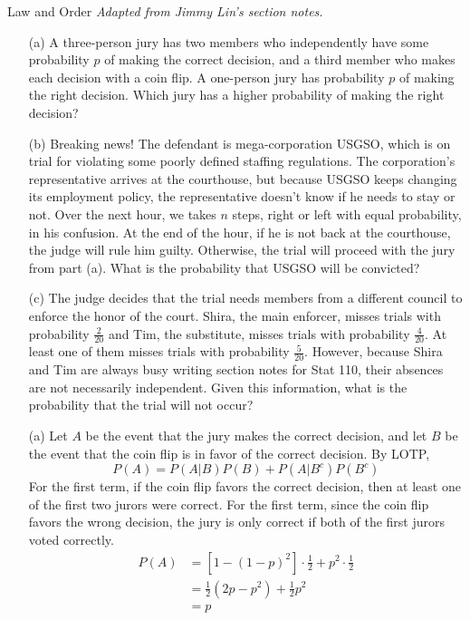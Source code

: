 \documentclass[11pt]{article}
\begin{document}
\begin{exercise}{Law and Order}
\textit{Adapted from Jimmy Lin's section notes.}
\begin{enumerate}
    \item [(a)] A three-person jury has two members who independently have some probability $p$ of making
    the correct decision, and a third member who makes each decision with a coin flip. A one-person
    jury has probability $p$ of making the right decision. Which jury has a higher probability
    of making the right decision?
    
    \item[(b)] Breaking news! The defendant is mega-corporation USGSO, which is on trial for violating some poorly defined staffing regulations. The corporation's representative arrives at the courthouse, but because USGSO keeps changing its employment policy, the representative doesn't know if he needs to stay or not. Over the next hour, we takes $n$ steps, right or left with equal probability, in his confusion. At the end of the hour, if he is not back at the courthouse, the judge will rule him 
    guilty. Otherwise, the trial will proceed with the jury from part (a). What is the probability
    that USGSO will be convicted?
    
    \item[(c)] The judge decides that the trial needs members from a different council to enforce
    the honor of the court. Shira, the main enforcer, misses trials with probability $\frac{2}{20}$ and 
    Tim, the substitute, misses trials with probability $\frac{4}{20}$. At least one of them
    misses trials with probability $\frac{5}{20}$. However, because Shira and Tim are always 
    busy writing section notes for Stat 110, their absences are not necessarily independent. 
    Given this information, what is the probability that the trial will not occur?
\end{enumerate}

\begin{solution}{4}
\begin{enumerate}
    \item [(a)] Let $A$ be the event that the jury makes the correct decision, and let $B$ be the
    event that the coin flip is in favor of the correct decision. By LOTP, 
        \[P(A) = P(A|B)P(B) + P(A|B^c)P(B^c)\]
    For the first term, if the coin flip favors the correct decision, then at least one of the 
    first two jurors were correct. For the first term, since the coin flip favors the wrong decision,
    the jury is only correct if both of the first jurors voted correctly. 
    \begin{align}
        P(A) &= \left[1- (1-p)^2\right]\cdot \frac{1}{2} + p^2 \cdot \frac{1}{2}\\
        &= \frac{1}{2}(2p-p^2) + \frac{1}{2} p^2\\
        &= p
    \end{align}
    

\end{enumerate}
\end{solution}
\end{exercise}
\end{document}
